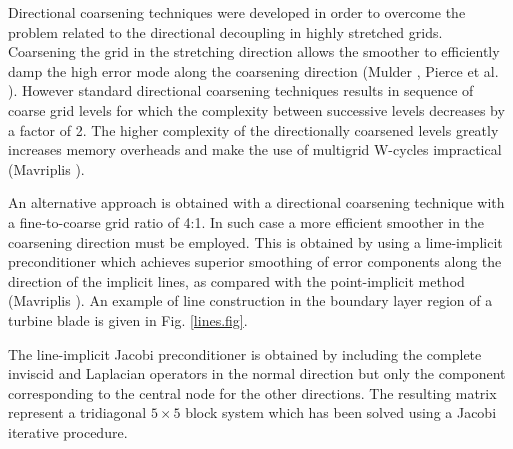  Directional coarsening techniques were developed in order to overcome the problem related
 to the directional decoupling in highly stretched grids.
 Coarsening the grid in the stretching direction allows the smoother to efficiently damp
 the high error mode along the coarsening direction (Mulder ,
 Pierce et al. ). However standard directional coarsening techniques
 results in sequence of coarse grid levels for which the complexity between successive levels
 decreases by a factor of 2. The higher complexity of the directionally coarsened levels greatly
 increases memory overheads and make the use of multigrid W-cycles impractical
 (Mavriplis ).

 An alternative approach is obtained with a directional coarsening technique
 with a fine-to-coarse grid ratio of 4:1. In such case a more efficient smoother in the
 coarsening direction must be employed. This is obtained by using a
 lime-implicit preconditioner which achieves superior smoothing of error
 components along the direction of the implicit lines,
 as compared with the point-implicit method (Mavriplis ).
 An example of line construction in the boundary layer region of a turbine blade
 is given in Fig. \ref{lines.fig}.

 The line-implicit Jacobi preconditioner is obtained by including the complete
 inviscid and Laplacian operators in the normal direction but only the component
 corresponding to the central node for the other directions.
 The resulting matrix represent a tridiagonal $5\times 5$ block system which
 has been solved using a Jacobi iterative procedure.
%
%
%
%
